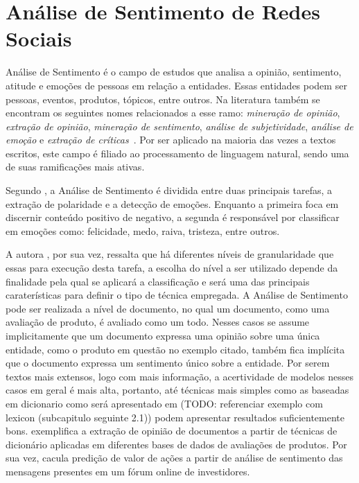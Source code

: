 \chapter{Análise de Sentimento de Redes Sociais}
\label{chapter:sentiment}

Análise de Sentimento é o campo de estudos que analisa a opinião, sentimento,
atitude e emoções de pessoas em relação a entidades.
Essas entidades podem ser pessoas, eventos, produtos, tópicos, entre outros.
Na literatura também se encontram os seguintes nomes relacionados a esse ramo:
\textit{mineração de opinião}, \textit{extração de opinião},
\textit{mineração de sentimento}, \textit{análise de subjetividade},
\textit{análise de emoção} e \textit{extração de críticas}~\cite{liu15}.
Por ser aplicado na maioria das vezes a textos escritos, este campo é filiado
ao processamento de linguagem natural, sendo uma de suas ramificações mais
ativas.

Segundo \citet{cambria16}, a Análise de Sentimento é dividida entre duas
principais tarefas, a extração de polaridade e a detecção de emoções.
Enquanto a primeira foca em discernir conteúdo positivo de negativo, a segunda é
responsável por classificar em emoções como: felicidade, medo, raiva, tristeza,
entre outros.

A autora \citet{liu15}, por sua vez, ressalta que há diferentes níveis de
granularidade que essas para execução desta tarefa, a escolha do nível a ser
utilizado depende da finalidade pela qual se aplicará a classificação e será uma
das principais caraterísticas para definir o tipo de técnica empregada.
A Análise de Sentimento pode ser realizada a nível de documento, no qual um
documento, como uma avaliação de produto, é avaliado como um todo.
Nesses casos se assume implicitamente que um documento expressa uma opinião
sobre uma única entidade, como o produto em questão no exemplo citado, também
fica implícita que o documento expressa um sentimento único sobre a entidade.
Por serem textos mais extensos, logo com mais informação, a acertividade de
modelos nesses casos em geral é mais alta, portanto, até técnicas mais simples
como as baseadas em dicionario como será apresentado em (TODO: referenciar exemplo com lexicon
(subcapitulo seguinte 2.1)) podem apresentar resultados suficientemente bons.
\citet{taboada11} exemplifica a extração de opinião de documentos a partir de
técnicas de dicionário aplicadas em diferentes bases de dados de avaliações de
produtos.
Por sua vez, \citet{das07} cacula predição de valor de ações a partir de
análise de sentimento das mensagens presentes em um fórum online de investidores.


